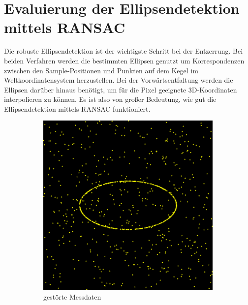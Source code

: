 {\section{Evaluierung der Ellipsendetektion mittels RANSAC}
Die robuste Ellipsendetektion ist der wichtigste Schritt bei der Entzerrung. Bei beiden Verfahren werden die bestimmten Ellipsen genutzt um Korrespondenzen zwischen den Sample-Positionen und Punkten auf dem Kegel im Weltkoordinatensystem herzustellen. Bei der Vorwärtsentfaltung werden die Ellipsen darüber hinaus benötigt, um für die Pixel geeignete 3D-Koordinaten interpolieren zu können. Es ist also von großer Bedeutung, wie gut die Ellipsendetektion mittels RANSAC funktioniert.


\begin{figure}[!htb]
	\centering
	\begin{subfigure}{.5\textwidth}
		\centering
		\includegraphics[width=.9\textwidth]{images/ransac50_0.png}
		\caption{gestörte Messdaten}
		\label{fig:uniformRansac1}
	\end{subfigure}%
	\begin{subfigure}{.5\textwidth}
		\centering

\end{subfigure}
\end{figure}}
